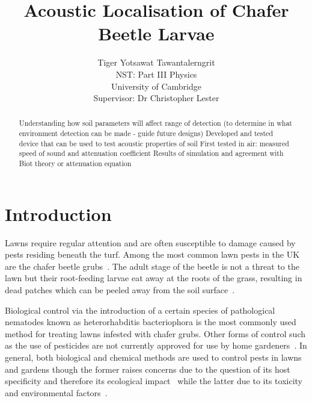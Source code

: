 \documentclass[twocolumn]{article}
\begin{document}

\title{\LARGE \textbf{Acoustic Localisation of Chafer Beetle Larvae}}

\author{
    Tiger Yotsawat Tawantalerngrit\\
    NST: Part III Physics\\
    University of Cambridge \\
    Supervisor: Dr Christopher Lester
}

\pagestyle{fancy}       %
\thispagestyle{empty}   %

\maketitle

\begin{abstract}
    Understanding how soil parameters will affect range of detection (to determine in what environment detection can be made - guide future designs)
    Developed and tested device that can be used to test acoustic properties of soil
    First tested in air: measured speed of sound and attenuation coefficient
    Results of simulation and agreement with Biot theory or attenuation equation
\end{abstract}

\tableofcontents

\section{Introduction}
Lawns require regular attention and are often susceptible to damage caused by pests residing beneath the turf. Among the most common lawn pests in the UK are the chafer beetle grubs~\cite{alford_2012}. The adult stage of the beetle is not a threat to the lawn but their root-feeding larvae eat away at the roots of the grass, resulting in dead patches which can be peeled away from the soil surface~\cite{smitley_2012}.

Biological control via the introduction of a certain species of pathological nematodes known as heterorhabditis bacteriophora is the most commonly used method for treating lawns infested with chafer grubs. Other forms of control such as the use of pesticides are not currently approved for use by home gardeners~\cite{chafer_grubs_in_lawns}. In general, both biological and chemical methods are used to control pests in lawns and gardens though the former raises concerns due to the question of its host specificity and therefore its ecological impact~\cite{mcevoy_1996} while the latter due to its toxicity and environmental factors~\cite{crampton_2020}.
\end{document}
